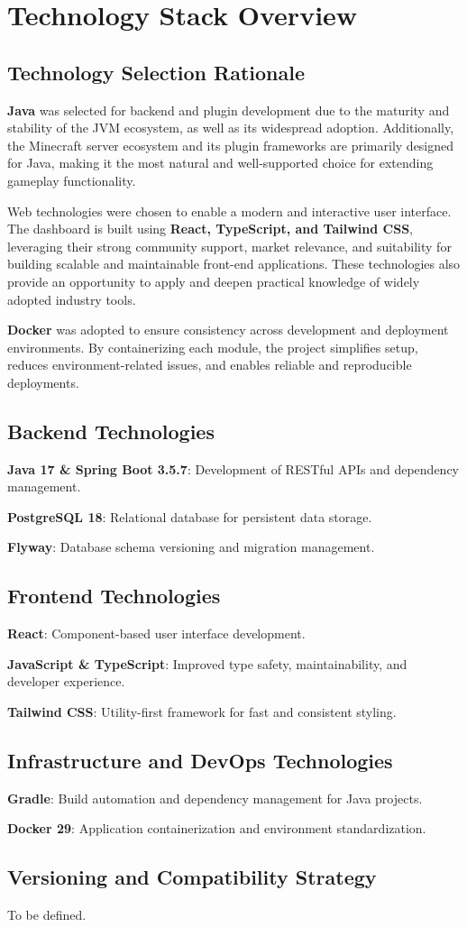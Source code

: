 \section{Technology Stack Overview}

\subsection{Technology Selection Rationale}
\textbf{Java} was selected for backend and plugin development due to the maturity and stability of the JVM ecosystem, as well as its widespread adoption. Additionally, the Minecraft server ecosystem and its plugin frameworks are primarily designed for Java, making it the most natural and well-supported choice for extending gameplay functionality.

Web technologies were chosen to enable a modern and interactive user interface. The dashboard is built using \textbf{React, TypeScript, and Tailwind CSS}, leveraging their strong community support, market relevance, and suitability for building scalable and maintainable front-end applications. These technologies also provide an opportunity to apply and deepen practical knowledge of widely adopted industry tools.

\textbf{Docker} was adopted to ensure consistency across development and deployment environments. By containerizing each module, the project simplifies setup, reduces environment-related issues, and enables reliable and reproducible deployments.

\subsection{Backend Technologies}
\textbf{Java 17 \& Spring Boot 3.5.7}: Development of RESTful APIs and dependency management.

\textbf{PostgreSQL 18}: Relational database for persistent data storage.

\textbf{Flyway}: Database schema versioning and migration management.

\subsection{Frontend Technologies}
\textbf{React}: Component-based user interface development.

\textbf{JavaScript \& TypeScript}: Improved type safety, maintainability, and developer experience.

\textbf{Tailwind CSS}: Utility-first framework for fast and consistent styling.

\subsection{Infrastructure and DevOps Technologies}
\textbf{Gradle}: Build automation and dependency management for Java projects.

\textbf{Docker 29}: Application containerization and environment standardization.

\subsection{Versioning and Compatibility Strategy}
To be defined.
